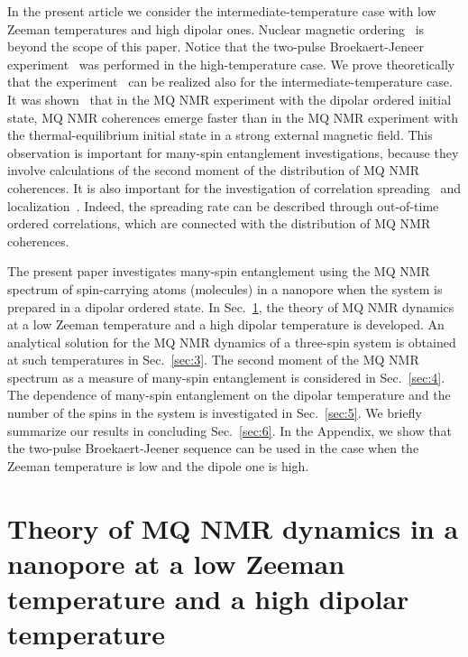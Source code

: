 \documentclass[review]{elsarticle}
\begin{document}
In the present article we consider the intermediate-temperature case with low Zeeman temperatures and high dipolar ones. 
Nuclear magnetic ordering~\cite{Abragam_1982} is beyond the scope of this paper.
Notice that the two-pulse Broekaert-Jeneer experiment~\cite{Jeener_1967} was performed in the high-temperature case.
We prove theoretically that the experiment~\cite{Jeener_1967} can be realized also for the intermediate-temperature case. 
It was shown~\cite{Doronin_2011} that in the MQ NMR experiment with the dipolar ordered initial state, MQ NMR coherences emerge faster 
than in the MQ NMR experiment with the thermal-equilibrium initial state in a strong external magnetic field.
This observation is important for many-spin entanglement investigations, because they involve calculations of the second moment of the distribution of MQ NMR coherences. 
It is also important for the investigation of correlation spreading~\cite{Baugh_2001,Baum_1986,S_nchez_2014,Munowitz_1987} and localization~\cite{Alvarez_2015,Wei_2018}.
Indeed, the spreading rate can be described through out-of-time ordered correlations, which are connected with the distribution of MQ NMR coherences. 

The present paper investigates many-spin entanglement using the MQ NMR spectrum of spin-carrying atoms (molecules) in a nanopore when the system is prepared in a dipolar ordered state.
In Sec.~\ref{sec:2}, the theory of MQ NMR dynamics at a low Zeeman temperature and a high dipolar temperature is developed.
An analytical solution for the MQ NMR dynamics of a three-spin system is obtained at such temperatures in Sec.~\ref{sec:3}.
The second moment of the MQ NMR spectrum as a measure of many-spin entanglement is considered in Sec.~\ref{sec:4}.
The dependence of many-spin entanglement on the dipolar temperature and the number of the spins in the system is investigated in Sec.~\ref{sec:5}.
We briefly summarize our results in concluding Sec.~\ref{sec:6}.
In the Appendix, we show that the two-pulse Broekaert-Jeener sequence can be used in the case when the Zeeman temperature is low and the dipole one is high.



\section{Theory of MQ NMR dynamics in a nanopore at a low Zeeman temperature and a high dipolar temperature}
\label{sec:2}
\end{document}
